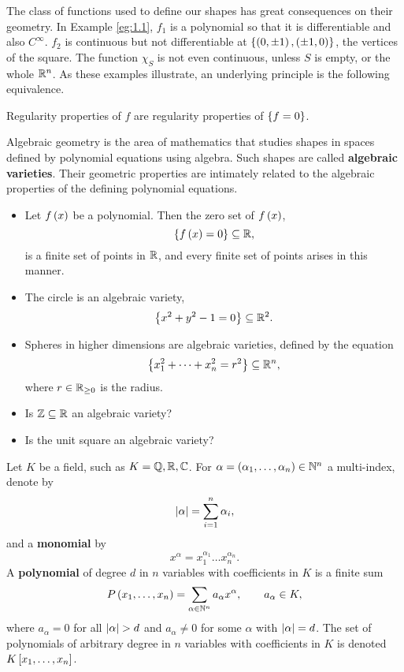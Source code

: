 The class of functions used to define our shapes has great consequences on their geometry. In Example \ref{eg:1.1}, $ f_1 $ is a polynomial so that it is differentiable and also $ C^\infty $. $ f_2 $ is continuous but not differentiable at $ \cb{\rb{0, \pm 1}, \rb{\pm 1, 0}} $, the vertices of the square. The function $ \chi_S $ is not even continuous, unless $ S $ is empty, or the whole $ \R^n $. As these examples illustrate, an underlying principle is the following equivalence.

\begin{fact*}
Regularity properties of $ f $ are regularity properties of $ \cb{f = 0} $.
\end{fact*}

Algebraic geometry is the area of mathematics that studies shapes in spaces defined by polynomial equations using algebra. Such shapes are called \textbf{algebraic varieties}. Their geometric properties are intimately related to the algebraic properties of the defining polynomial equations.

\begin{example}
\hfill
\begin{itemize}
\item Let $ f\rb{x} $ be a polynomial. Then the zero set of $ f\rb{x} $,
$$ \cb{f\rb{x} = 0} \subseteq \R, $$
is a finite set of points in $ \R $, and every finite set of points arises in this manner.
\item The circle is an algebraic variety,
$$ \cb{x^2 + y^2 - 1 = 0} \subseteq \R^2. $$
\item Spheres in higher dimensions are algebraic varieties, defined by the equation
$$ \cb{x_1^2 + \dots + x_n^2 = r^2} \subseteq \R^n, $$
where $ r \in \R_{\ge 0} $ is the radius.
\end{itemize}
\end{example}

\begin{exercise}
\hfill
\begin{itemize}
\item Is $ \Z \subseteq \R $ an algebraic variety?
\item Is the unit square an algebraic variety?
\end{itemize}
\end{exercise}

\begin{definition}
Let $ K $ be a field, such as $ K = \Q, \R, \C $. For $ \alpha = \rb{\alpha_1, \dots, \alpha_n} \in \N^n $ a multi-index, denote by
$$ \abs{\alpha} = \sum_{i = 1}^n \alpha_i, $$
and a \textbf{monomial} by
$$ x^\alpha = x_1^{\alpha_1} \dots x_n^{\alpha_n}. $$
A \textbf{polynomial} of degree $ d $ in $ n $ variables with coefficients in $ K $ is a finite sum
$$ P\rb{x_1, \dots, x_n} = \sum_{\alpha \in \N^n} a_\alpha x^\alpha, \qquad a_\alpha \in K, $$
where $ a_\alpha = 0 $ for all $ \abs{\alpha} > d $ and $ a_\alpha \ne 0 $ for some $ \alpha $ with $ \abs{\alpha} = d $. The set of polynomials of arbitrary degree in $ n $ variables with coefficients in $ K $ is denoted $ K\sb{x_1, \dots, x_n} $.
\end{definition}

